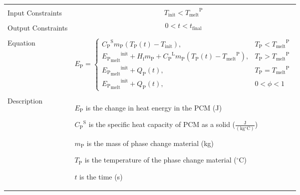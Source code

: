 \documentclass[12pt]{article}
\begin{document}
\begin{minipage}{\textwidth}
\begin{tabular}{>{\raggedright}p{}>{\raggedright\arraybackslash}p{}}
\\ \midrule \\
Input Constraints & \begin{displaymath}
                    {T_{\text{init}}}<{{T_{\text{melt}}}^{\text{P}}}
                    \end{displaymath}
\\ \midrule \\
Output Constraints & \begin{displaymath}
                     0<t<{t_{\text{final}}}
                     \end{displaymath}
\\ \midrule \\
Equation & \begin{displaymath}
           {E_{\text{P}}}=\begin{cases}
                          {{C_{\text{P}}}^{\text{S}}} {m_{\text{P}}} \left({T_{\text{P}}}\left(t\right)-{T_{\text{init}}}\right), & {T_{\text{P}}}<{{T_{\text{melt}}}^{\text{P}}}\\
                          {{{E_{\text{P}}}_{\text{melt}}}^{\text{init}}}+{H_{\text{f}}} {m_{\text{P}}}+{{C_{\text{P}}}^{\text{L}}} {m_{\text{P}}} \left({T_{\text{P}}}\left(t\right)-{{T_{\text{melt}}}^{\text{P}}}\right), & {T_{\text{P}}}>{{T_{\text{melt}}}^{\text{P}}}\\
                          {{{E_{\text{P}}}_{\text{melt}}}^{\text{init}}}+{Q_{\text{P}}}\left(t\right), & {T_{\text{P}}}={{T_{\text{melt}}}^{\text{P}}}\\
                          {{{E_{\text{P}}}_{\text{melt}}}^{\text{init}}}+{Q_{\text{P}}}\left(t\right), & 0<ϕ<1
                          \end{cases}
           \end{displaymath}
\\ \midrule \\
Description & \begin{symbDescription}
              \item{${E_{\text{P}}}$ is the change in heat energy in the PCM (J)}
              \item{${{C_{\text{P}}}^{\text{S}}}$ is the specific heat capacity of PCM as a solid ($\frac{\text{J}}{(\text{kg}{}^{\circ}\text{C})}$)}
              \item{${m_{\text{P}}}$ is the mass of phase change material (kg)}
              \item{${T_{\text{P}}}$ is the temperature of the phase change material (${}^{\circ}$C)}
              \item{$t$ is the time (s)}

\end{symbDescription}
\end{tabular}
\end{minipage}
\end{document}
